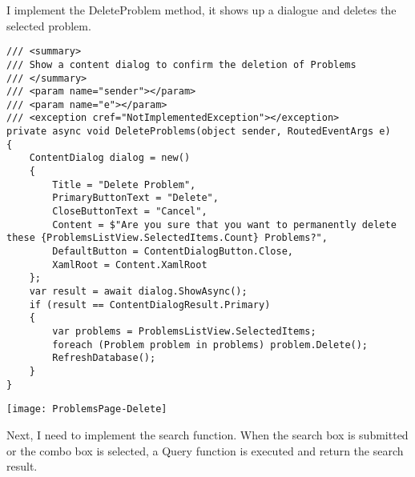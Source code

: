 \documentclass[report.tex]{subfiles}
\begin{document}
I implement the DeleteProblem method, it shows up a dialogue and deletes the selected problem.

\begin{verbatim}
/// <summary>
/// Show a content dialog to confirm the deletion of Problems
/// </summary>
/// <param name="sender"></param>
/// <param name="e"></param>
/// <exception cref="NotImplementedException"></exception>
private async void DeleteProblems(object sender, RoutedEventArgs e)
{
    ContentDialog dialog = new()
    {
        Title = "Delete Problem",
        PrimaryButtonText = "Delete",
        CloseButtonText = "Cancel",
        Content = $"Are you sure that you want to permanently delete these {ProblemsListView.SelectedItems.Count} Problems?",
        DefaultButton = ContentDialogButton.Close,
        XamlRoot = Content.XamlRoot
    };
    var result = await dialog.ShowAsync();
    if (result == ContentDialogResult.Primary)
    {
        var problems = ProblemsListView.SelectedItems;
        foreach (Problem problem in problems) problem.Delete();
        RefreshDatabase();
    }
}
\end{verbatim}

\texttt{[image: ProblemsPage-Delete]}

Next, I need to implement the search function. When the search box is submitted or the combo box is selected, a Query function is executed and return the search result.
\end{document}
